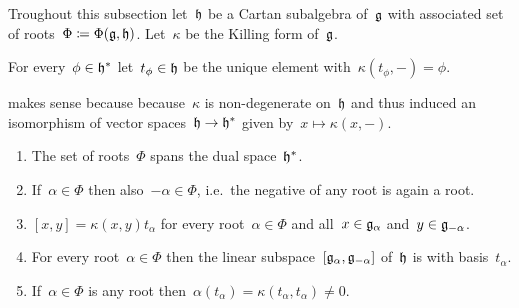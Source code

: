 \begin{convention}
  Troughout this subsection let~$\mathfrak{h}$ be a Cartan subalgebra of~$\mathfrak{g}$ with associated set of roots~$\Phi \coloneqq \Phi(\mathfrak{g},\mathfrak{h})$.
  Let~$\kappa$ be the Killing form of~$\mathfrak{g}$.
\end{convention}


\begin{definition}
  \label{def of t_phi}
  For every~$\phi \in \mathfrak{h}^*$ let~$t_\phi \in \mathfrak{h}$ be the unique element with~$\kappa(t_{\phi}, -) = \phi$.
\end{definition}


\begin{remark}
   makes sense because because~$\kappa$ is non-degenerate on~$\mathfrak{h}$ and thus induced an isomorphism of vector spaces~$\mathfrak{h} \to \mathfrak{h}^*$ given by~$x \mapsto \kappa(x,-)$.
\end{remark}


\begin{proposition}
  \leavevmode
  \begin{enumerate}
    \item 
      The set of roots~$\Phi$ spans the dual space~$\mathfrak{h}^*$.
    \item
      If~$\alpha \in \Phi$ then also~$-\alpha \in \Phi$, i.e.\ the negative of any root is again a root.
    \item
      \label{bracket via kappa}
      $[x,y] = \kappa(x,y) t_\alpha$ for every root~$\alpha \in \Phi$ and all~$x \in \mathfrak{g}_\alpha$ and~$y \in \mathfrak{g}_{-\alpha}$.
    \item
      For every root~$\alpha \in \Phi$ then the linear subspace~$[\mathfrak{g}_\alpha, \mathfrak{g}_{-\alpha}]$ of~$\mathfrak{h}$ is {\onedimensional} with basis~$t_\alpha$.
    \item
      If~$\alpha \in \Phi$ is any root then~$\alpha(t_\alpha) = \kappa(t_\alpha, t_\alpha) \neq 0$.
  \end{enumerate}
\end{proposition}


